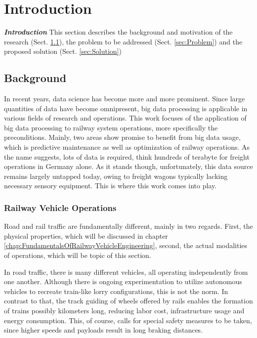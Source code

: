 \chapter{Introduction}
\label{chap:Introduction}
\par\noindent
\textit{\textbf{Introduction}} This section describes the background and motivation of the research (Sect. \ref{sec:Background}), the problem to be addressed (Sect. \ref{sec:Problem}) and the proposed solution (Sect. \ref{sec:Solution}) 

\section{Background}
\label{sec:Background}
\par\noindent
In recent years, data science has become more and more prominent. Since large quantities of data have become omnipresent, big data processing is applicable in various fields of research and operations. This work focuses of the application of big data processing to railway system operations, more specifically the preconditions. Mainly, two areas show promise to benefit from big data usage, which is predictive maintenance as well as optimization of railway operations. As the name suggests, lots of data is required, think hundreds of terabyte for freight operations in Germany alone. As it stands though, unfortunately, this data source remains largely untapped today, owing to freight wagons typically lacking necessary sensory equipment. This is where this work comes into play.

\subsection{Railway Vehicle Operations}
\label{sec:RailwayVehicleOperations}
\par\noindent
Road and rail traffic are fundamentally different, mainly in two regards. First, the physical properties, which will be discussed in chapter \ref{chap:FundamentalsOfRailwayVehicleEngineering}, second, the actual modalities of operations, which will be topic of this section.
\par
In road traffic, there is many different vehicles, all operating independently from one another. Although there is ongoing experimentation to utilize autonomous vehicles to recreate train-like lorry configurations, this is not the norm. In contrast to that, the track guiding of wheels offered by rails enables the formation of trains possibly kilometers long, reducing labor cost, infrastructure usage and energy consumption. This, of course, calls for special safety measures to be taken, since higher speeds and payloads result in long braking distances. 

